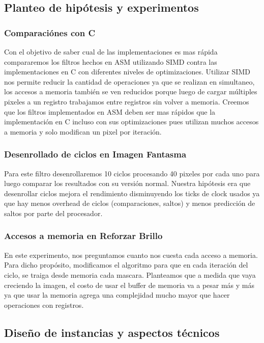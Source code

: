 \documentclass[a4paper]{article}
\begin{document}
\subsection{Planteo de hipótesis y experimentos}

\subsubsection{Comparaci\'ones con C}

Con el objetivo de saber cual de las implementaciones es mas r\'apida compararemos los filtros hechos en ASM utilizando SIMD contra las implementaciones en C con diferentes niveles de optimizaciones. Utilizar SIMD nos permite reducir la cantidad de operaciones ya que se realizan en simultaneo, los accesos a memoria también se ven reducidos porque luego de cargar múltiples pixeles a un registro trabajamos entre registros sin volver a memoria. Creemos que los filtros implementados en ASM deben ser mas r\'apidos que la implementaci\'on en C incluso con sus optimizaciones pues utilizan muchos accesos a memoria y solo modifican un pixel por iteraci\'on.

\subsubsection{Desenrollado de ciclos en Imagen Fantasma}

Para este filtro desenrollaremos 10 ciclos procesando 40 pixeles por cada uno para luego comparar los resultados con su versi\'on normal. Nuestra hipótesis era que desenrollar ciclos mejora el rendimiento disminuyendo los ticks de clock usados ya que hay menos overhead de ciclos (comparaciones, saltos) y menos predicci\'on de saltos por parte del procesador.

\subsubsection{Accesos a memoria en Reforzar Brillo}

En este experimento, nos preguntamos cuanto nos cuesta cada acceso a memoria. Para dicho propósito, modificamos el algoritmo para que en cada iteración del ciclo, se traiga desde memoria cada mascara. Planteamos que a medida que vaya creciendo la imagen, el costo de usar el buffer de memoria va a pesar m\'as y m\'as ya que usar la memoria agrega una complejidad mucho mayor que hacer operaciones con registros. 

\subsection{Dise\~no de instancias y aspectos t\'ecnicos}
\end{document}
